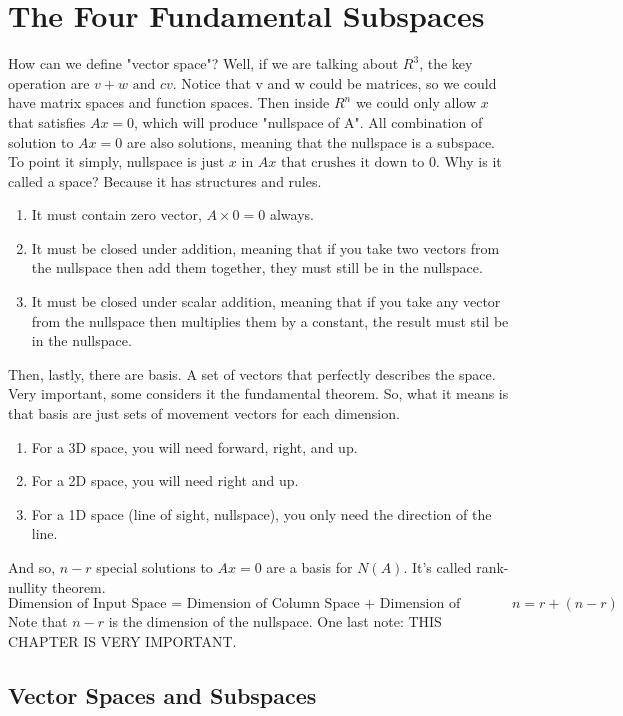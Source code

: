 \chapter{The Four Fundamental Subspaces}

How can we define "vector space"? Well, if we are talking about \(R^3\), the key operation are \(v + w \text{ and } cv\).
Notice that v and w could be matrices, so we could have matrix spaces and function spaces. Then inside \(R^n\) we could only allow \(x\) that satisfies \(Ax = 0\), which will produce "nullspace of A".
All combination of solution to \(Ax = 0\) are also solutions, meaning that the nullspace is a subspace. To point it simply, nullspace is just \(x \text{ in } Ax \text{ that crushes it down to } 0\). Why is it called a space? Because it has structures and rules. 
\begin{enumerate}
    \item It must contain zero vector, \(A \times 0 = 0\) always.
    \item It must be closed under addition, meaning that if you take two vectors from the nullspace then add them together, they must still be in the nullspace.
    \item It must be closed under scalar addition, meaning that if you take any vector from the nullspace then multiplies them by a constant, the result must stil be in the nullspace. 
\end{enumerate}
Then, lastly, there are basis. A set of vectors that perfectly describes the space. Very important, some considers it the fundamental theorem. So, what it means is that basis are just sets of movement vectors for each dimension.
\begin{enumerate}
    \item For a 3D space, you will need forward, right, and up.
    \item For a 2D space, you will need right and up.
    \item For a 1D space (line of sight, nullspace), you only need the direction of the line.
\end{enumerate}

And so, \(n - r\) special solutions to \(Ax = 0\) are a basis for \(N(A)\). It's called rank-nullity theorem.
\[
    \text{Dimension of Input Space = Dimension of Column Space + Dimension of Nullspace, }
    n = r + (n - r)
\] 
Note that \(n - r\) is the dimension of the nullspace. 
One last note: THIS CHAPTER IS VERY IMPORTANT.
\section{Vector Spaces and Subspaces}


